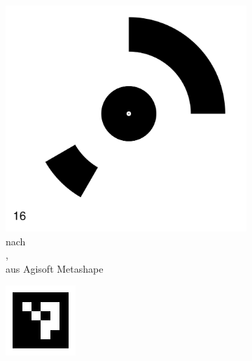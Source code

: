 \documentclass[./00PhotoBox.tex]{subfiles}
\begin{document}
\begin{figure}
    \centering
    \begin{subfigure}{0.45\textwidth}
        \includegraphics[width=0.98\linewidth]{img/2_grundlagen/schneider.png}
        \centering
        \caption{ nach \\ \cite{schneider},\\aus Agisoft Metashape} %
        \label{img:schneider} %
    \end{subfigure}
    \begin{subfigure}{0.45\textwidth}
        \includegraphics[width=0.98\linewidth]{img/2_grundlagen/aruco.png}

\end{subfigure}
\end{figure}
\end{document}
